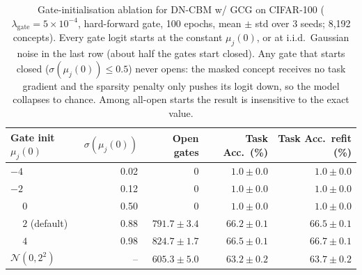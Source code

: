 \begin{table}[h]
  \centering
  \begin{tabular}{lrrrr}
    \toprule
    \textbf{Gate init} $\mu_j(0)$ & $\sigma(\mu_j(0))$ & \textbf{Open gates} & \textbf{Task Acc.\ (\%)} & \textbf{Task Acc.\ refit (\%)} \\
    \midrule
    $-4$                       & 0.02 & $0$              & $\phantom{0}1.0 \pm 0.0$ & $\phantom{0}1.0 \pm 0.0$ \\
    $-2$                       & 0.12 & $0$              & $\phantom{0}1.0 \pm 0.0$ & $\phantom{0}1.0 \pm 0.0$ \\
    $\phantom{-}0$             & 0.50 & $0$              & $\phantom{0}1.0 \pm 0.0$ & $\phantom{0}1.0 \pm 0.0$ \\
    $\phantom{-}2$ (default)   & 0.88 & $791.7 \pm 3.4$  & $66.2 \pm 0.1$ & $66.5 \pm 0.1$ \\
    $\phantom{-}4$             & 0.98 & $824.7 \pm 1.7$  & $66.5 \pm 0.1$ & $66.7 \pm 0.1$ \\
    $\mathcal{N}(0, 2^2)$      & --   & $605.3 \pm 5.0$  & $63.2 \pm 0.2$ & $63.7 \pm 0.2$ \\
    \bottomrule
  \end{tabular}
  \caption{Gate-initialisation ablation for DN-CBM w/ GCG on CIFAR-100 ($\lambda_{\text{gate}} = 5\times10^{-4}$, hard-forward gate, 100 epochs, mean $\pm$ std over 3 seeds; 8{,}192 concepts). Every gate logit starts at the constant $\mu_j(0)$, or at i.i.d.\ Gaussian noise in the last row (about half the gates start closed). Any gate that starts closed ($\sigma(\mu_j(0)) \le 0.5$) never opens: the masked concept receives no task gradient and the sparsity penalty only pushes its logit down, so the model collapses to chance. Among all-open starts the result is insensitive to the exact value.}
  \label{tab:gate_init}
\end{table}
